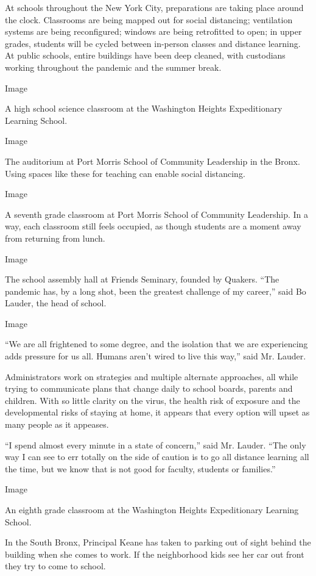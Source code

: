 At schools throughout the New York City, preparations are taking place
around the clock. Classrooms are being mapped out for social distancing;
ventilation systems are being reconfigured; windows are being
retrofitted to open; in upper grades, students will be cycled between
in-person classes and distance learning. At public schools, entire
buildings have been deep cleaned, with custodians working throughout the
pandemic and the summer break.

Image

A high school science classroom at the Washington Heights Expeditionary
Learning School.

Image

The auditorium at Port Morris School of Community Leadership in the
Bronx. Using spaces like these for teaching can enable social
distancing.

Image

A seventh grade classroom at Port Morris School of Community Leadership.
In a way, each classroom still feels occupied, as though students are a
moment away from returning from lunch.

Image

The school assembly hall at Friends Seminary, founded by Quakers. ``The
pandemic has, by a long shot, been the greatest challenge of my
career,'' said Bo Lauder, the head of school.

Image

``We are all frightened to some degree, and the isolation that we are
experiencing adds pressure for us all. Humans aren't wired to live this
way,'' said Mr. Lauder.

Administrators work on strategies and multiple alternate approaches, all
while trying to communicate plans that change daily to school boards,
parents and children. With so little clarity on the virus, the health
risk of exposure and the developmental risks of staying at home, it
appears that every option will upset as many people as it appeases.

``I spend almost every minute in a state of concern,'' said Mr. Lauder.
``The only way I can see to err totally on the side of caution is to go
all distance learning all the time, but we know that is not good for
faculty, students or families.''

Image

An eighth grade classroom at the Washington Heights Expeditionary
Learning School.

In the South Bronx, Principal Keane has taken to parking out of sight
behind the building when she comes to work. If the neighborhood kids see
her car out front they try to come to school.


